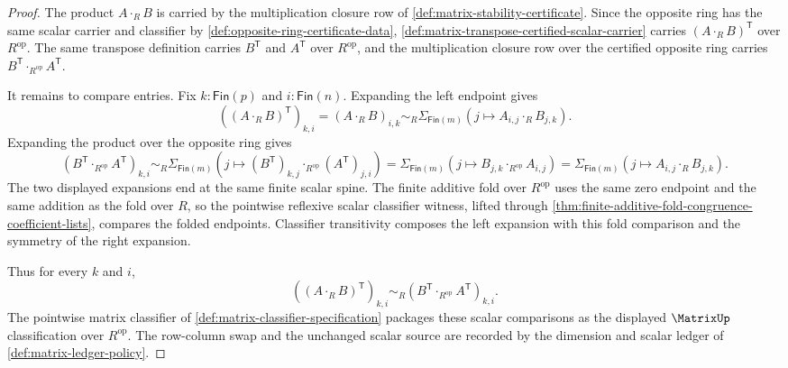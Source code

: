 \begin{proof}
The product $A\cdot_RB$ is carried by the multiplication closure row of \autoref{def:matrix-stability-certificate}. Since the opposite ring has the same scalar carrier and classifier by \autoref{def:opposite-ring-certificate-data}, \autoref{def:matrix-transpose-certified-scalar-carrier} carries $(A\cdot_RB)^{\mathsf{T}}$ over $R^{\mathrm{op}}$. The same transpose definition carries $B^{\mathsf{T}}$ and $A^{\mathsf{T}}$ over $R^{\mathrm{op}}$, and the multiplication closure row over the certified opposite ring carries $B^{\mathsf{T}}\cdot_{R^{\mathrm{op}}}A^{\mathsf{T}}$.

It remains to compare entries. Fix $k:\mathsf{Fin}(p)$ and
$i:\mathsf{Fin}(n)$. Expanding the left endpoint gives
$$
((A\cdot_RB)^{\mathsf{T}})_{k,i}
=(A\cdot_RB)_{i,k}
\sim_R
\Sigma_{\mathsf{Fin}(m)}(j\mapsto A_{i,j}\cdot_RB_{j,k}).
$$
Expanding the product over the opposite ring gives
$$
(B^{\mathsf{T}}\cdot_{R^{\mathrm{op}}}A^{\mathsf{T}})_{k,i}
\sim_R
\Sigma_{\mathsf{Fin}(m)}(j\mapsto
(B^{\mathsf{T}})_{k,j}\cdot_{R^{\mathrm{op}}}(A^{\mathsf{T}})_{j,i})
=
\Sigma_{\mathsf{Fin}(m)}(j\mapsto B_{j,k}\cdot_{R^{\mathrm{op}}}A_{i,j})
=
\Sigma_{\mathsf{Fin}(m)}(j\mapsto A_{i,j}\cdot_RB_{j,k}).
$$
The two displayed expansions end at the same finite scalar spine. The finite additive fold over $R^{\mathrm{op}}$ uses the same zero endpoint and the same addition as the fold over $R$, so the pointwise reflexive scalar classifier witness, lifted through \autoref{thm:finite-additive-fold-congruence-coefficient-lists}, compares the folded endpoints. Classifier transitivity composes the left expansion with this fold comparison and the symmetry of the right expansion.

Thus for every $k$ and $i$,
$$
((A\cdot_RB)^{\mathsf{T}})_{k,i}
\sim_R
(B^{\mathsf{T}}\cdot_{R^{\mathrm{op}}}A^{\mathsf{T}})_{k,i}.
$$
The pointwise matrix classifier of \autoref{def:matrix-classifier-specification} packages these scalar comparisons as the displayed $\MatrixUp$ classification over $R^{\mathrm{op}}$. The row-column swap and the unchanged scalar source are recorded by the dimension and scalar ledger of \autoref{def:matrix-ledger-policy}.
\end{proof}


